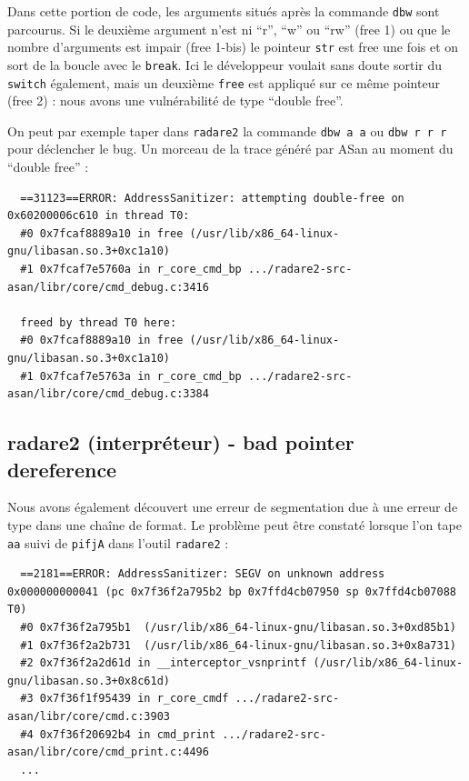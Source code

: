 Dans cette portion de code, les arguments situés après la commande \lstinline{dbw} sont parcourus.
Si le deuxième argument n'est ni ``r'', ``w'' ou ``rw'' (free 1) ou que le nombre d'arguments est impair (free 1-bis) le pointeur \lstinline{str} est free une fois et on sort de la boucle avec le \lstinline{break}.
Ici le développeur voulait sans doute sortir du \lstinline{switch} également, mais un deuxième \lstinline{free} est appliqué sur ce même pointeur (free 2) : nous avons une vulnérabilité de type ``double free''.

On peut par exemple taper dans \lstinline{radare2} la commande \lstinline{dbw a a} ou \lstinline{dbw r r r} pour déclencher le bug.
Un morceau de la trace généré par ASan au moment du ``double free'' :
\begin{lstlisting}
  ==31123==ERROR: AddressSanitizer: attempting double-free on 0x60200006c610 in thread T0:
  #0 0x7fcaf8889a10 in free (/usr/lib/x86_64-linux-gnu/libasan.so.3+0xc1a10)
  #1 0x7fcaf7e5760a in r_core_cmd_bp .../radare2-src-asan/libr/core/cmd_debug.c:3416

  freed by thread T0 here:
  #0 0x7fcaf8889a10 in free (/usr/lib/x86_64-linux-gnu/libasan.so.3+0xc1a10)
  #1 0x7fcaf7e5763a in r_core_cmd_bp .../radare2-src-asan/libr/core/cmd_debug.c:3384
\end{lstlisting}

\subsection{radare2 (interpréteur) - bad pointer dereference}

Nous avons également découvert une erreur de segmentation due à une erreur de type dans une chaîne de format.
Le problème peut être constaté lorsque l'on tape \lstinline{aa} suivi de \lstinline{pifjA} dans l'outil \lstinline{radare2} :

\begin{lstlisting}
  ==2181==ERROR: AddressSanitizer: SEGV on unknown address 0x000000000041 (pc 0x7f36f2a795b2 bp 0x7ffd4cb07950 sp 0x7ffd4cb07088 T0)
  #0 0x7f36f2a795b1  (/usr/lib/x86_64-linux-gnu/libasan.so.3+0xd85b1)
  #1 0x7f36f2a2b731  (/usr/lib/x86_64-linux-gnu/libasan.so.3+0x8a731)
  #2 0x7f36f2a2d61d in __interceptor_vsnprintf (/usr/lib/x86_64-linux-gnu/libasan.so.3+0x8c61d)
  #3 0x7f36f1f95439 in r_core_cmdf .../radare2-src-asan/libr/core/cmd.c:3903
  #4 0x7f36f20692b4 in cmd_print .../radare2-src-asan/libr/core/cmd_print.c:4496
  ...
\end{lstlisting}

